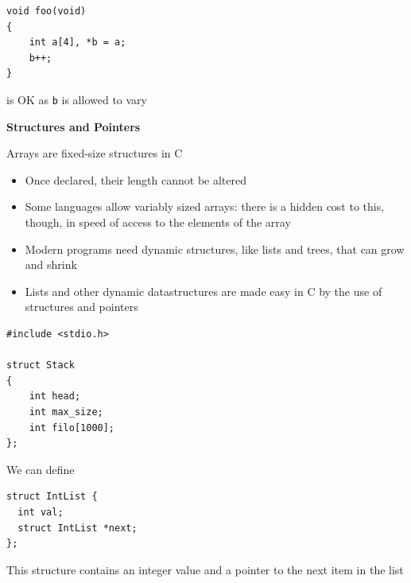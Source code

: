 \documentclass{beamer}
\def\code#1{{\ifmmode\else\large\fi\tt#1}}
\begin{document}
\begin{frame}[fragile]
\begin{block}{}
\begin{lstlisting}
void foo(void)
{
    int a[4], *b = a;
    b++; 
}
\end{lstlisting}
\end{block}

is OK as \code{b} is allowed to vary
\end{frame}

\begin{frame}
\begin{center}
\textbf{Structures and Pointers}
\end{center}
Arrays are fixed-size structures in C
\begin{itemize}
\item Once declared, their length cannot be altered
\item Some languages allow variably sized arrays: there is a hidden cost to this, though, in speed of access to the elements of the array
\item Modern programs need dynamic structures, like lists and trees, that can grow and shrink
\item Lists and other dynamic datastructures are made easy in C by the use of structures and pointers
\end{itemize}
\end{frame}

\begin{frame}[fragile]
\begin{block}{}
\begin{lstlisting}
#include <stdio.h>

struct Stack
{
    int head;
    int max_size;
    int filo[1000];
};
\end{lstlisting}
\end{block}
\end{frame}

\begin{frame}[fragile]
We can define
\bigskip
\begin{block}{}
\begin{lstlisting}
struct IntList {
  int val;
  struct IntList *next;
};
\end{lstlisting}
\end{block}
\bigskip
This structure contains an integer value and a pointer to the next item in the list
\end{frame}
\end{document}
